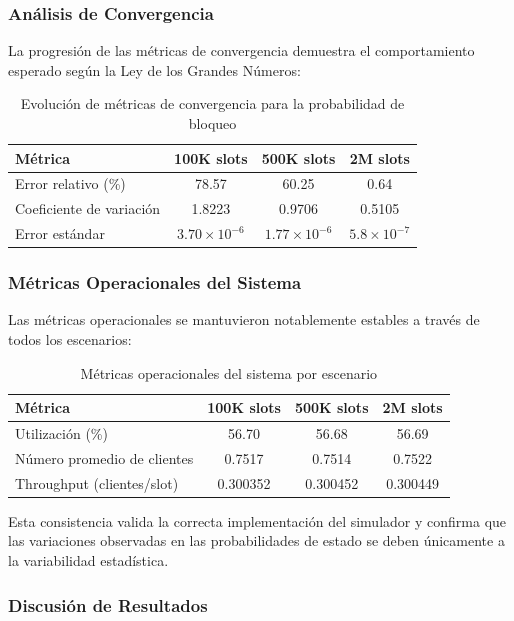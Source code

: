 \documentclass{article}
\begin{document}
\subsubsection{Análisis de Convergencia}
La progresión de las métricas de convergencia demuestra el comportamiento esperado según la Ley de los Grandes Números:
\begin{table}[H]
    \centering
    \caption{Evolución de métricas de convergencia para la probabilidad de bloqueo}
    \begin{tabular}{|l|c|c|c|}
        \hline
        \textbf{Métrica} & \textbf{100K slots} & \textbf{500K slots} & \textbf{2M slots} \\
        \hline
        Error relativo (\%) & 78.57 & 60.25 & 0.64 \\
        Coeficiente de variación & 1.8223 & 0.9706 & 0.5105 \\
        Error estándar & $3.70 \times 10^{-6}$ & $1.77 \times 10^{-6}$ & $5.8 \times 10^{-7}$ \\
        \hline
    \end{tabular}
\end{table}

\subsubsection{Métricas Operacionales del Sistema}
Las métricas operacionales se mantuvieron notablemente estables a través de todos los escenarios:
\begin{table}[H]
    \centering
    \caption{Métricas operacionales del sistema por escenario}
    \begin{tabular}{|l|c|c|c|}
        \hline
        \textbf{Métrica} & \textbf{100K slots} & \textbf{500K slots} & \textbf{2M slots} \\
        \hline
        Utilización (\%) & 56.70 & 56.68 & 56.69 \\
        Número promedio de clientes & 0.7517 & 0.7514 & 0.7522 \\
        Throughput (clientes/slot) & 0.300352 & 0.300452 & 0.300449 \\
        \hline
    \end{tabular}
\end{table}
Esta consistencia valida la correcta implementación del simulador y confirma que las variaciones observadas en las probabilidades de estado se deben únicamente a la variabilidad estadística.

\subsubsection{Discusión de Resultados}
\end{document}
